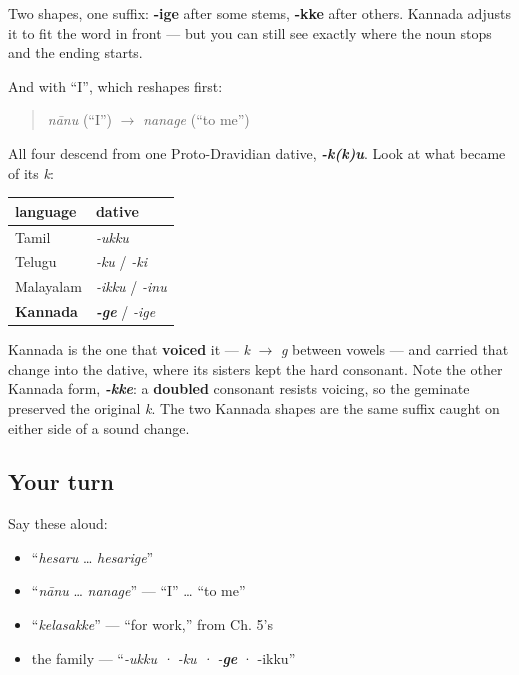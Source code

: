 Two shapes, one suffix: \textbf{-ige} after some stems, \textbf{-kke} after others. Kannada adjusts it to fit the word in front — but you can still see exactly where the noun stops and the ending starts.

And with \textquotedblleft{}I\textquotedblright{}, which reshapes first:

\begin{quote}
\textbf{} \emph{nānu} (\textquotedblleft{}I\textquotedblright{}) $\to$ \textbf{} \emph{nanage} (\textquotedblleft{}to me\textquotedblright{})
\end{quote}

\begin{cousinweb}
All four descend from one Proto-Dravidian dative, \emph{\textbf{-k(k)u}}. Look at what became of its \emph{k}:

\noindent
\begin{tabularx}{\linewidth}{@{}>{\raggedright\arraybackslash}X>{\raggedright\arraybackslash}X@{}}
\toprule
\textbf{language} & \textbf{dative} \\
\midrule
Tamil & \emph{-ukku} \\
Telugu & \emph{-ku} / \emph{-ki} \\
Malayalam & \emph{-ikku} / \emph{-inu} \\
\textbf{Kannada} & \emph{\textbf{-ge}} / \emph{-ige} \\
\bottomrule
\end{tabularx}

Kannada is the one that \textbf{voiced} it — \emph{k} $\to$ \emph{g} between vowels — and carried that change into the dative, where its sisters kept the hard consonant. Note the other Kannada form, \emph{\textbf{-kke}}: a \textbf{doubled} consonant resists voicing, so the geminate preserved the original \emph{k}. The two Kannada shapes are the same suffix caught on either side of a sound change.
\end{cousinweb}

\subsection*{Your turn}
Say these aloud:

\begin{itemize}
\raggedright
  \item \textquotedblleft{}\emph{hesaru} … \emph{hesarige}\textquotedblright{}
  \item \textquotedblleft{}\emph{nānu} … \emph{nanage}\textquotedblright{} — \textquotedblleft{}I\textquotedblright{} … \textquotedblleft{}to me\textquotedblright{}
  \item \textquotedblleft{}\emph{kelasakke}\textquotedblright{} — \textquotedblleft{}for work,\textquotedblright{} from Ch. 5's 
  \item the family — \textquotedblleft{}\emph{-ukku · -ku · -\textbf{ge}} · -ikku\textquotedblright{}
\end{itemize}


